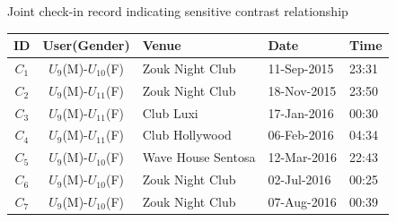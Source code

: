 \documentclass{tikzposter} %
\begin{document}
\begin{columns}
{\begin{itemize}
\begin{enumerate}
\begin{description}
		 \centering
    		Joint check-in record indicating sensitive contrast relationship
  	 \end{description}
  	 \begin{minipage}{\linewidth}
  		 \centering
 		  \fontsize{24pt}{24pt}\selectfont
  		 \begin{tabular}{c | c  | p{9cm} | p{6cm}  | p{3cm}}	
			\toprule	
			ID  	&  	\textbf{User(Gender)}& 	\textbf{Venue} 		& 	\textbf{Date} 	&	\textbf{Time}	\\
			\midrule
			$C_1$	&	$U_9$(M)-$U_{10}$(F)	 &	Zouk Night Club		&	11-Sep-2015	    &	23:31\\
			$C_2$	&	$U_9$(M)-$U_{11}$(F)	 &	Zouk Night Club		&	18-Nov-2015	    &	23:50\\
			$C_3$	&	$U_9$(M)-$U_{11}$(F)	 &	Club Luxi			&	17-Jan-2016	    &	00:30\\
			$C_4$	&	$U_9$(M)-$U_{11}$(F)	 &	Club Hollywood		&	06-Feb-2016     &	04:34\\
			$C_5$	&	$U_9$(M)-$U_{10}$(F)	 &	Wave House Sentosa	&	12-Mar-2016	    &	22:43\\
			$C_6$	&	$U_9$(M)-$U_{10}$(F)	 &	Zouk Night Club		&	02-Jul-2016	    &	00:25\\
			$C_7$	&	$U_9$(M)-$U_{10}$(F)	 &	Zouk Night Club		&	07-Aug-2016	    &	00:39\\
			\bottomrule
  		 \end{tabular}
  	 \end{minipage}
\end{enumerate}

\end{itemize}
}




\end{columns}
\end{document}
